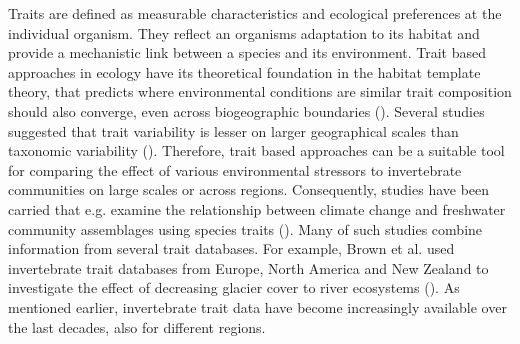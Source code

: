 \documentclass{article}
\begin{document}
Traits are defined as measurable characteristics and ecological preferences at the individual organism. %
They reflect an organisms adaptation to its habitat and provide a mechanistic link between a species and its environment. Trait based approaches in ecology have its theoretical foundation in the habitat template theory, that predicts where environmental conditions are similar trait composition should also converge, even across biogeographic boundaries (\cite{southwood_habitat_1977}). %
Several studies suggested that trait variability is lesser on larger geographical scales than taxonomic variability (\cite{bonada_taxonomic_2007}). Therefore, trait based approaches can be a suitable tool for comparing the effect of various environmental stressors to invertebrate communities on large scales or across regions. 
Consequently, studies have been carried that e.g. examine the relationship between climate change and freshwater community assemblages using species traits (\cite{bhowmik_large_2015, brown_functional_2018}).
Many of such studies combine information from several trait databases. For example, Brown et al. used invertebrate trait databases from Europe, North America and New Zealand to investigate the effect of decreasing glacier cover to river ecosystems (\cite{brown_functional_2018}).
As mentioned earlier, invertebrate trait data have become increasingly available over the last decades, also for different regions.
\end{document}
